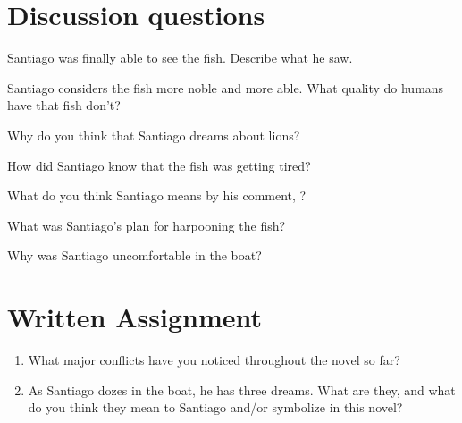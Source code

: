 \documentclass[12pt]{article} %
\begin{document}
\section*{Discussion questions}
  \begin{qstn}
    Santiago was finally able to see the fish. Describe what he saw.
  \end{qstn}
  \begin{qstn}
    Santiago considers the fish more noble and more able. What quality do humans have that fish don't?
  \end{qstn}
  \begin{qstn}
    Why do you think that Santiago dreams about lions?
  \end{qstn}
  \begin{qstn}
    How did Santiago know that the fish was getting tired?
  \end{qstn}
  \begin{qstn}
    What do you think Santiago means by his comment,
    ?
  \end{qstn}
  \begin{qstn}
    What was Santiago's plan for harpooning the fish?
  \end{qstn}
  \begin{qstn}
    Why was Santiago uncomfortable in the boat?
  \end{qstn}

\section*{Written Assignment}
\begin{enumerate}
  \item What major conflicts have you noticed throughout the novel so far?
  \item As Santiago dozes in the boat, he has three dreams. What are they, and what do you think they mean to Santiago and/or symbolize in this novel?
\end{enumerate}
\end{document}
